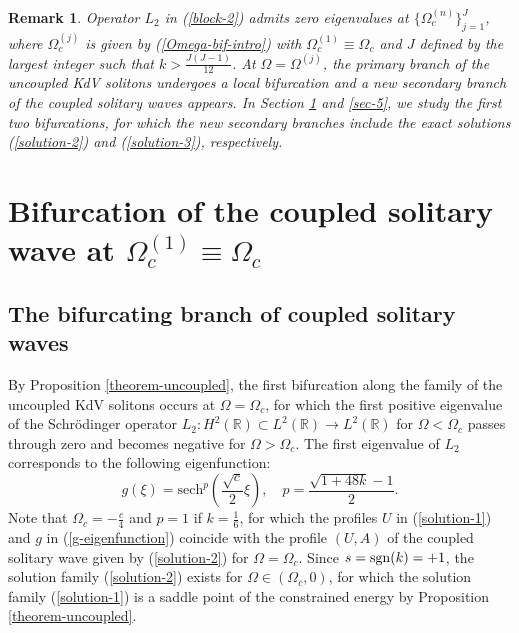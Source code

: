 \documentclass[12pt,reqno]{amsart}
\numberwithin{equation}{section}
\newtheorem{remark}{Remark}
\begin{document}
\begin{remark}
Operator $L_2$ in (\ref{block-2}) admits zero eigenvalues at $\{ \Omega_c^{(n)} \}_{j=1}^{J}$, where $\Omega_c^{(j)}$ is given by (\ref{Omega-bif-intro}) with 
$\Omega_c^{(1)} \equiv \Omega_c$ and $J$ defined by the largest integer such that $k > \frac{J(J-1)}{12}$. At $\Omega = \Omega^{(j)}$, the primary branch of the uncoupled KdV solitons undergoes a local bifurcation and a new secondary branch of the coupled solitary waves appears. In Section \ref{sec-4} and \ref{sec-5}, we study the first two bifurcations, for which the new secondary branches include the exact solutions (\ref{solution-2}) and (\ref{solution-3}), respectively.
\end{remark}

\section{Bifurcation of the coupled solitary wave at $\Omega_c^{(1)} \equiv \Omega_c$}
\label{sec-4}

\subsection{The bifurcating branch of coupled solitary waves}

By Proposition \ref{theorem-uncoupled}, the first bifurcation along the family of the uncoupled KdV solitons occurs at $\Omega = \Omega_c$, for which the first positive eigenvalue of the Schr\"{o}dinger operator $L_2: H^2(\mathbb{R}) \subset L^2(\mathbb{R}) \to L^2(\mathbb{R})$ for $\Omega < \Omega_c$ passes through zero and becomes negative for $\Omega > \Omega_c$. The first eigenvalue of $L_2$ corresponds to the following eigenfunction:
\begin{equation}
\label{g-eigenfunction}
    g(\xi) = \text{sech}^{p}\left( \frac{\sqrt{c}}{2} \xi\right), \quad p = \frac{\sqrt{1+48 k}-1}{2}.
\end{equation}
Note that $\Omega_c = -\frac{c}{4}$ and $p = 1$ if $k = \frac{1}{6}$, for which 
the profiles $U$ in (\ref{solution-1}) and $g$ in (\ref{g-eigenfunction}) coincide
with the profile $(U,A)$ of the coupled solitary wave given by (\ref{solution-2}) for $\Omega = \Omega_c$. Since $s = {\rm sgn}(k) = +1$, the solution family (\ref{solution-2}) exists for $\Omega \in (\Omega_c,0)$, 
for which the solution family (\ref{solution-1}) is a saddle point of the constrained energy by Proposition \ref{theorem-uncoupled}.


\end{document}
